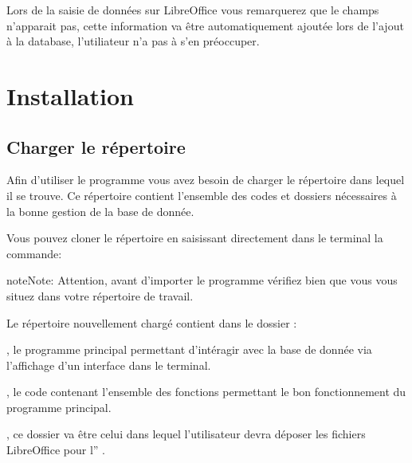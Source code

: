\documentclass[letterpaper,10pt,french]{sphinxmanual}
\begin{document}
\sphinxAtStartPar
Lors de la saisie de données sur LibreOffice vous remarquerez que le champs  n’apparait pas, cette information va être automatiquement ajoutée lors de l’ajout à la database, l’utiliateur n’a pas à s’en
préoccuper.

\sphinxstepscope


\chapter{Installation}
\label{\detokenize{install:installation}}\label{\detokenize{install::doc}}

\section{Charger le répertoire}
\label{\detokenize{install:charger-le-repertoire}}
\sphinxAtStartPar
Afin d’utiliser le programme vous avez besoin de charger le répertoire dans lequel il se trouve. Ce répertoire
contient l’ensemble des codes et dossiers nécessaires à la bonne gestion de la base de donnée.

\sphinxAtStartPar
Vous pouvez cloner le répertoire en saisissant directement dans le terminal la commande:

\begin{sphinxVerbatim}[commandchars=\\\{\}]
\end{sphinxVerbatim}

\begin{sphinxadmonition}{note}{Note:}
\sphinxAtStartPar
Attention, avant d’importer le programme vérifiez bien que vous vous situez dans votre répertoire de travail.
\end{sphinxadmonition}

\sphinxAtStartPar
Le répertoire nouvellement chargé contient dans le dossier :

\sphinxAtStartPar
{}, le programme principal permettant d’intéragir avec la base de donnée via l’affichage d’un interface dans le terminal.

\sphinxAtStartPar
{}, le code contenant l’ensemble des fonctions permettant le bon fonctionnement du programme principal.

\sphinxAtStartPar
{}, ce dossier va être celui dans lequel l’utilisateur devra déposer les fichiers LibreOffice pour l” {\hyperref[\detokenize{adddata:import}]{}}.
\end{document}
